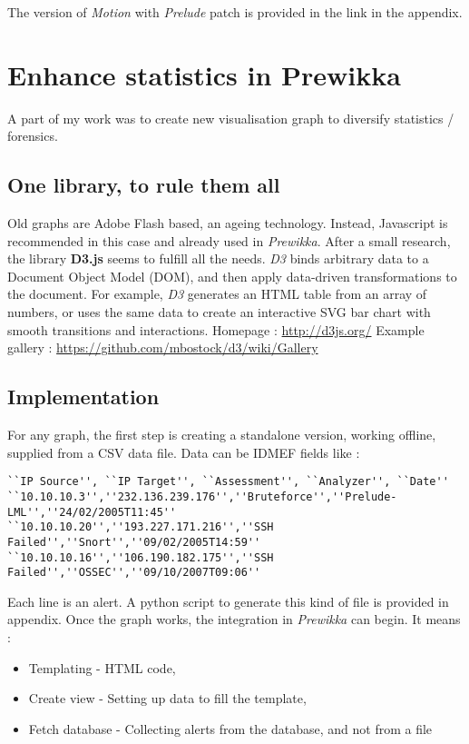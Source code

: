 \documentclass{koala-en}
\begin{document}
The version of \emph{Motion} with \emph{Prelude} patch is provided in the link in the appendix.

\thispagestyle{fancy}
\newpage

\section{Enhance statistics in Prewikka}
A part of my work was to create new visualisation graph to diversify statistics / forensics.

\subsection{One library, to rule them all}
Old graphs are Adobe Flash based, an ageing technology.
\newline
\newline
Instead, Javascript is recommended in this case and already used in \emph{Prewikka}. After a small research, the library \textbf{D3.js} seems to fulfill all the needs.
\newline
\newline
\emph{D3} binds arbitrary data to a Document Object Model (DOM), and then apply data-driven transformations to the document. For example, \emph{D3} generates an HTML table from an array of numbers, or uses the same data to create an interactive SVG bar chart with smooth transitions and interactions.
\newline
\newline
Homepage : \url{http://d3js.org/}
\newline
Example gallery : \url{https://github.com/mbostock/d3/wiki/Gallery}

\subsection{Implementation}
For any graph, the first step is creating a standalone version, working offline, supplied from a CSV data file. Data can be IDMEF fields like :
\begin{lstlisting}
``IP Source'', ``IP Target'', ``Assessment'', ``Analyzer'', ``Date''
``10.10.10.3'',''232.136.239.176'',''Bruteforce'',''Prelude-LML'',''24/02/2005T11:45''
``10.10.10.20'',''193.227.171.216'',''SSH Failed'',''Snort'',''09/02/2005T14:59''
``10.10.10.16'',''106.190.182.175'',''SSH Failed'',''OSSEC'',''09/10/2007T09:06''
\end{lstlisting}

Each line is an alert. A python script to generate this kind of file is provided in appendix.
\newline
\newline
Once the graph works, the integration in \emph{Prewikka} can begin. It means :
\begin{itemize}
  \item Templating - HTML code,
  \item Create view - Setting up data to fill the template,
  \item Fetch database - Collecting alerts from the database, and not from a file
\end{itemize}
\end{document}
